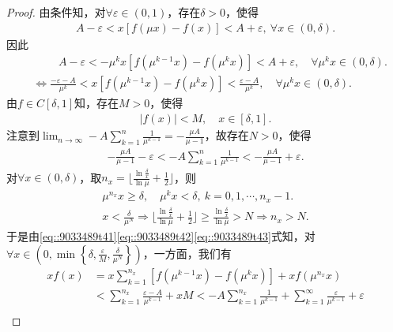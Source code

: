\documentclass[../../main.tex]{subfiles}%
\begin{document}
\begin{proof}
由条件知，对$\forall \varepsilon \in (0,1)$，存在$\delta > 0$，使得
\begin{align*}
A - \varepsilon < x\left[ f\left( \mu x \right) - f\left( x \right) \right] < A + \varepsilon, \ \forall x \in (0,\delta). 
\end{align*}
因此
\begin{align}
&\quad \quad \,\,A-\varepsilon <-\mu ^kx\left[ f\left( \mu ^{k-1}x \right) -f\left( \mu ^kx \right) \right] <A+\varepsilon , \quad \forall \mu ^kx\in (0,\delta ).
\nonumber \\
&\Longleftrightarrow \frac{-\varepsilon -A}{\mu ^k}<x\left[ f\left( \mu ^{k-1}x \right) -f\left( \mu ^kx \right) \right] <\frac{\varepsilon -A}{\mu ^k}, \quad  \forall \mu ^kx\in (0,\delta ).\label{eq::9033489t41}
\end{align}
由$f \in C\left[ \delta,1 \right]$知，存在$M > 0$，使得
\begin{align}
\left| f\left( x \right) \right| < M, \quad x \in \left[ \delta,1 \right]. \label{eq::9033489t42}
\end{align}
注意到$\lim_{n \to \infty} -A\sum_{k=1}^n \frac{1}{\mu^{k-1}} = -\frac{\mu A}{\mu - 1}$，故存在$N > 0$，使得
\begin{align}
-\frac{\mu A}{\mu - 1} - \varepsilon < -A\sum_{k=1}^n \frac{1}{\mu^{k-1}} < -\frac{\mu A}{\mu - 1} + \varepsilon. \label{eq::9033489t43}
\end{align}
对$\forall x \in (0,\delta)$，取$n_x = \lfloor \frac{\ln \frac{\delta}{x}}{\ln \mu} + \frac{1}{2} \rfloor$，则
\begin{gather*}
\mu^{n_x} x \geqslant \delta, \quad \mu^k x < \delta, \ k = 0,1,\cdots,n_x - 1.\\
x < \frac{\delta}{\mu^N} \Longrightarrow \lfloor \frac{\ln \frac{\delta}{x}}{\ln \mu} + \frac{1}{2} \rfloor \geqslant \frac{\ln \frac{\delta}{x}}{\ln \mu} > N \Longrightarrow n_x > N.
\end{gather*}
于是由\eqref{eq::9033489t41}\eqref{eq::9033489t42}\eqref{eq::9033489t43}式知，对$\forall x \in \left( 0,\min \left\{ \delta, \frac{\varepsilon}{M}, \frac{\delta}{\mu^N} \right\} \right)$，一方面，我们有
\begin{align*}
xf\left( x \right) &= x\sum_{k=1}^{n_x} \left[ f\left( \mu^{k-1}x \right) - f\left( \mu^k x \right) \right] + xf\left( \mu^{n_x} x \right) \\
&< \sum_{k=1}^{n_x} \frac{\varepsilon - A}{\mu^{k-1}} + xM < -A\sum_{k=1}^{n_x} \frac{1}{\mu^{k-1}} + \sum_{k=1}^{\infty} \frac{\varepsilon}{\mu^{k-1}} + \varepsilon \\

\end{align*}
\end{proof}
\end{document}
